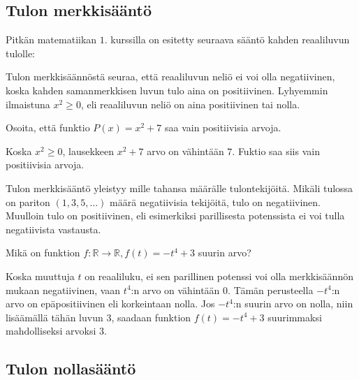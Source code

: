 \subsection*{Tulon merkkisääntö}

Pitkän matematiikan $1$. kurssilla on esitetty seuraava sääntö kahden reaaliluvun tulolle:


Tulon merkkisäännöstä seuraa, että reaaliluvun neliö ei voi olla negatiivinen, koska kahden samanmerkkisen luvun tulo aina on positiivinen. Lyhyemmin ilmaistuna $x^2 \geq 0$, eli reaaliluvun neliö on aina  positiivinen tai nolla.

\begin{esimerkki}
Osoita, että funktio $P(x)=x^2+7$ saa vain positiivisia arvoja.
    \begin{esimratk}
	Koska $x^2 \geq 0$, lausekkeen $x^2+7$ arvo on vähintään $7$. Fuktio saa siis
	vain positiivisia arvoja.
    \end{esimratk}
\end{esimerkki}

Tulon merkkisääntö yleistyy mille tahansa määrälle tulontekijöitä. Mikäli tulossa on pariton $(1, 3, 5, \ldots)$ määrä negatiivisia tekijöitä, tulo on negatiivinen. Muulloin tulo on positiivinen, eli esimerkiksi parillisesta potenssista ei voi tulla negatiivista vastausta.

\begin{esimerkki}
Mikä on funktion $f:\mathbb{R} \rightarrow \mathbb{R}, f(t)=-t^4+3$ suurin arvo?
    \begin{esimratk}
Koska muuttuja $t$ on reaaliluku, ei sen parillinen potenssi voi olla merkkisäännön mukaan negatiivinen, vaan $t^4$:n arvo on vähintään $0$. Tämän perusteella $-t^4$:n arvo on epäpositiivinen eli korkeintaan nolla. Jos $-t^4$:n suurin arvo on nolla, niin lisäämällä tähän luvun $3$, saadaan funktion $f(t)=-t^4+3$ suurimmaksi mahdolliseksi arvoksi $3$.
    \end{esimratk}
\end{esimerkki}

\subsection*{Tulon nollasääntö}

